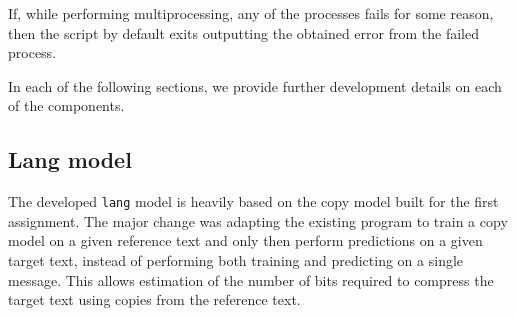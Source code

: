 \documentclass{article}
\begin{document}
If, while performing multiprocessing, any of the processes fails for some reason, then the script by default exits outputting the obtained error from the failed process.

In each of the following sections, we provide further development details on each of the components.

\subsection{Lang model}
\label{subsec:methodology_lang_model}

The developed \texttt{lang} model is heavily based on the copy model built for the first assignment.
The major change was adapting the existing program to train a copy model on a given reference text and only then perform predictions on a given target text, instead of performing both training and predicting on a single message.
This allows estimation of the number of bits required to compress the target text using copies from the reference text.
\end{document}
